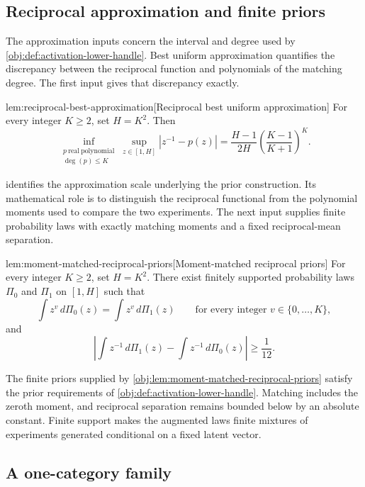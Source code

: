 \subsection{Reciprocal approximation and finite priors}

The approximation inputs concern the interval and degree used by \cref{obj:def:activation-lower-handle}. Best uniform approximation quantifies the discrepancy between the reciprocal function and polynomials of the matching degree. The first input gives that discrepancy exactly.

\begin{lemmav}{lem:reciprocal-best-approximation}[Reciprocal best uniform approximation]
For every integer \(K\ge 2\), set \(H=K^2\). Then
\[
\inf_{\substack{p\ \mathrm{real\ polynomial}\\ \deg(p)\le K}}
\sup_{z\in[1,H]}\left|z^{-1}-p(z)\right|
=
\frac{H-1}{2H}
\left(\frac{K-1}{K+1}\right)^K.
\]
\end{lemmav}

 identifies the approximation scale underlying the prior construction. Its mathematical role is to distinguish the reciprocal functional from the polynomial moments used to compare the two experiments. The next input supplies finite probability laws with exactly matching moments and a fixed reciprocal-mean separation.

\begin{lemmav}{lem:moment-matched-reciprocal-priors}[Moment-matched reciprocal priors]
For every integer \(K\ge 2\), set \(H=K^2\). There exist finitely supported probability laws \(\Pi_0\) and \(\Pi_1\) on \([1,H]\) such that
\[
\int z^v\,d\Pi_0(z)=\int z^v\,d\Pi_1(z)
\qquad\text{for every integer }v\in\{0,\ldots,K\},
\]
and
\[
\left|\int z^{-1}\,d\Pi_1(z)-\int z^{-1}\,d\Pi_0(z)\right|
\ge \frac{1}{12}.
\]
\end{lemmav}

The finite priors  supplied by \cref{obj:lem:moment-matched-reciprocal-priors} satisfy the prior requirements of \cref{obj:def:activation-lower-handle}. Matching includes the zeroth moment, and reciprocal separation remains bounded below by an absolute constant. Finite support makes the augmented laws finite mixtures of experiments generated conditional on a fixed latent vector.

\subsection{A one-category family}

